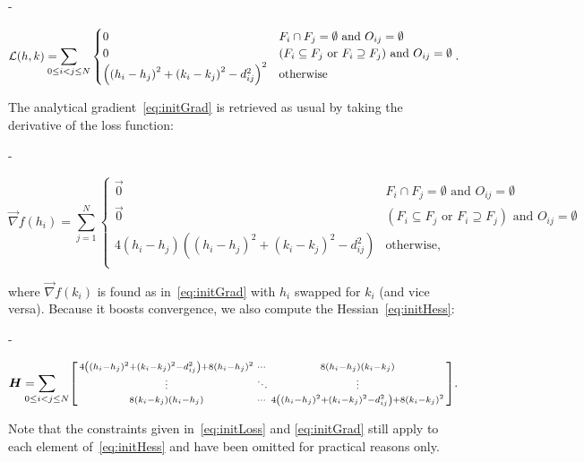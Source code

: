 \documentclass[
  oneside,
  openany,
  numbers=noendperiod,
  parskip=half,
  bibliography=totoc
]{scrbook}\usepackage[]{graphicx}\usepackage{xcolor}
\newlength{\overhang}
\newenvironment{fullwidth}{
  \begin{addmargin*}[0em]{-\overhang}
  }{
  \end{addmargin*}
}
\newcommand{\svdots}{\raisebox{3pt}{$\scalebox{.75}{\vdots}$}}
\newcommand{\sddots}{\raisebox{3pt}{$\scalebox{.75}{$\ddots$}$}}
\begin{document}
\begin{fullwidth}
\begin{equation}
  \mathcal{L}(h,k) = \displaystyle\smashoperator[l]{\sum_{0\leq i<j\leq N}}
  \begin{cases}
    0 & F_i \cap F_j = \emptyset \text{ and } O_{ij} = \emptyset\\
    0 & (F_i \subseteq F_j \text{ or } F_i \supseteq F_j) \text{ and } O_{ij}=\emptyset\\
   \left(\left(h_i-h_j\right)^2+\left(k_i-k_j\right)^2-d_{ij}^2\right)^2  & \text{otherwise} \\
  \end{cases}. \label{eq:initLoss}
\end{equation}
\end{fullwidth}
The analytical gradient~\eqref{eq:initGrad} is retrieved as usual by
taking the derivative of the loss function:
\begin{fullwidth}
\begin{equation}
  \vec{\nabla} f(h_i) = \sum_{j=1}^N
  \begin{cases}
    \vec{0} & F_i \cap F_j = \emptyset \text{ and } O_{ij} = \emptyset\\
    \vec{0} & (F_i \subseteq F_j \text{ or } F_i \supseteq F_j) \text{ and } O_{ij}=\emptyset\\
    4\left(h_i-h_j\right)\left(\left(h_i-h_j\right)^2+\left(k_i-k_j\right)^2-d_{ij}^2\right) & \text{otherwise}, \\
  \end{cases} \label{eq:initGrad}
\end{equation}
\end{fullwidth}
where $\vec{\nabla} f(k_i)$ is found as in~\eqref{eq:initGrad} with $h_i$
swapped for $k_i$ (and vice versa). Because it boosts convergence, we also
compute the Hessian~\eqref{eq:initHess}:
\begin{fullwidth}
\begin{equation}
  \bm{H} = \smashoperator[l]{\sum_{0\leq i<j\leq N}}
  \begin{bsmallmatrix}
    4\left(\left(h_i-h_j\right)^2+\left(k_i-k_j\right)^2-d_{ij}^2\right)+8\left(h_i-h_j\right)^2 &
    \cdots &
    8\left(h_i-h_j\right)\left(k_i-k_j\right)\\
    \svdots & \sddots & \svdots \\
    8\left(k_i-k_j\right)\left(h_i-h_j\right) &
    \cdots &
    4\left(\left(h_i-h_j\right)^2+\left(k_i-k_j\right)^2-d_{ij}^2\right)+8\left(k_i-k_j\right)^2
  \end{bsmallmatrix}.
\label{eq:initHess}
\end{equation}
\end{fullwidth}
Note that the constraints given in~\eqref{eq:initLoss} and \eqref{eq:initGrad}
still apply to each element of~\eqref{eq:initHess} and have been omitted for
practical reasons only.
\end{document}
